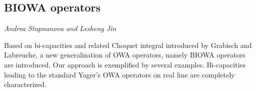 \documentclass[../booklet.tex]{subfiles}
\begin{document}
\subsection[BIOWA operators. {\it Andrea Stupnanova and Lesheng Jin}]{BIOWA operators}
 

\begin{center}
  {\it Andrea Stupnanova and Lesheng Jin}
\end{center}



Based on bi-capacities and related Choquet integral introduced by Grabisch and Labreuche, a new generalization of OWA operators, namely BIOWA operators are introduced. Our approach is exemplified by several examples. Bi-capacities leading to the standard Yager's OWA operators on real line are completely characterized.
\\
\end{document}
